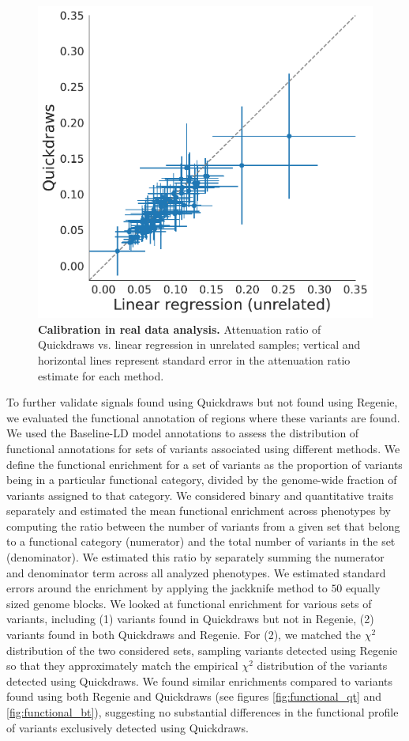 \begin{figure}
    \centering
    \includegraphics[width=0.65\linewidth]{figures/qd_ukb/attnratio_plot.pdf}
    \caption{\textbf{Calibration in real data analysis.} Attenuation ratio of Quickdraws vs. linear regression in unrelated samples; vertical and horizontal lines represent standard error in the attenuation ratio estimate for each method. }
    \label{fig:real1c}
\end{figure}

%
To further validate signals found using Quickdraws but not found using Regenie, we evaluated the functional annotation of regions where these variants are found.
%
We used the Baseline-LD model annotations \cite{finucane2015partitioning,gazal2017linkage} to assess the distribution of functional annotations for sets of variants associated using different methods.
%
We define the functional enrichment for a set of variants as the proportion of variants being in a particular functional category, divided by the genome-wide fraction of variants assigned to that category.
%
We considered binary and quantitative traits separately and estimated the mean functional enrichment across phenotypes by computing the ratio between the number of variants from a given set that belong to a functional category (numerator) and the total number of variants in the set (denominator).
%
We estimated this ratio by separately summing the numerator and denominator term across all analyzed phenotypes.
%
We estimated standard errors around the enrichment by applying the jackknife method to $50$ equally sized genome blocks.
%
We looked at functional enrichment for various sets of variants, including (1) variants found in Quickdraws but not in Regenie, (2) variants found in both Quickdraws and Regenie.
%
For (2), we matched the $\chi^2$ distribution of the two considered sets, sampling variants detected using Regenie so that they approximately match the empirical $\chi^2$ distribution of the variants detected using Quickdraws.
%
We found similar enrichments compared to variants found using both Regenie and Quickdraws (see figures \ref{fig:functional_qt} and \ref{fig:functional_bt}), suggesting no substantial differences in the functional profile of variants exclusively detected using Quickdraws.
%

